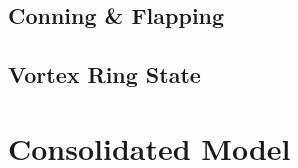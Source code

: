 \subsection{Conning \& Flapping}
\label{subsec:dynamics.aero.flap}
\subsection{Vortex Ring State}
\label{subsec:dynamics.aero.vrs}

\section{Consolidated Model}
\label{sec:dynamics.model}